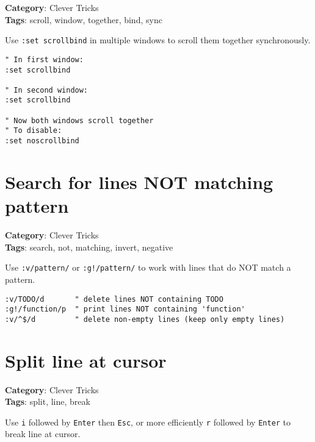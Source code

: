 {{{\textbf{Category}: Clever Tricks\\ \textbf{Tags}: scroll, window, together, bind, sync
\vspace{0.5cm}

Use {\footnotesize \Verb§:set scrollbind§} in multiple windows to scroll them together synchronously.

\begin{Exa*}{}
\begin{Verbatim}[fontsize=\footnotesize, breaklines, breakanywhere]
" In first window:
:set scrollbind

" In second window:
:set scrollbind

" Now both windows scroll together
" To disable:
:set noscrollbind
\end{Verbatim}
\end{Exa*}

\section{Search for lines NOT matching pattern}

\textbf{Category}: Clever Tricks\\ \textbf{Tags}: search, not, matching, invert, negative
\vspace{0.5cm}

Use {\footnotesize \Verb§:v/pattern/§} or {\footnotesize \Verb§:g!/pattern/§} to work with lines that do NOT match a pattern.

\begin{Exa*}{}
\begin{Verbatim}[fontsize=\footnotesize, breaklines, breakanywhere]
:v/TODO/d       " delete lines NOT containing TODO
:g!/function/p  " print lines NOT containing 'function'
:v/^$/d         " delete non-empty lines (keep only empty lines)
\end{Verbatim}
\end{Exa*}

\section{Split line at cursor}

\textbf{Category}: Clever Tricks\\ \textbf{Tags}: split, line, break
\vspace{0.5cm}

Use {\footnotesize \Verb§i§} followed by {\footnotesize \Verb§Enter§} then {\footnotesize \Verb§Esc§}, or more efficiently {\footnotesize \Verb§r§} followed by {\footnotesize \Verb§Enter§} to break line at cursor.

}}}
